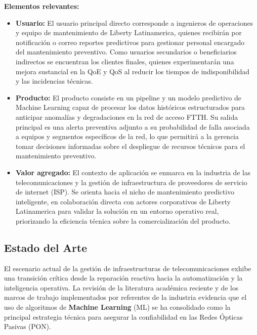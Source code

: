 \documentclass[12pt,a4paper]{article}
\begin{document}
    

    \noindent
    \textbf{Elementos relevantes:}
    \begin{itemize}
        \item \textbf{Usuario:} El usuario principal directo corresponde a ingenieros de operaciones y equipo de mantenimiento de Liberty Latinamerica, quienes recibirán por notificación o correo reportes
        predictivos para gestionar personal encargado del mantenimiento preventivo. Como usuarios secundarios o beneficiarios indirectos se encuentran los clientes finales, quienes experimentarán una mejora sustancial en la QoE
        y QoS al reducir los tiempos de indisponibilidad y las incidencias técnicas.
        \item \textbf{Producto:} El producto consiste en un pipeline y un modelo predictivo de Machine Learning capaz de procesar los datos históricos estructurados para anticipar anomalías y degradaciones en la red de acceso FTTH. Su salida
        principal es una alerta preventiva adjunto a su probabilidad de falla asociada a equipos y segmentos específicos de la red, lo que permitirá a la gerencia tomar decisiones informadas sobre el despliegue de recursos técnicos para el mantenimiento preventivo.
        \item \textbf{Valor agregado:} El contexto de aplicación se enmarca en la industria de las telecomunicaciones y la gestión de infraestructura de proveedores de servicio de internet (ISP). Se orienta hacia el nicho de mantenimiento predictivo
        inteligente, en colaboración directa con actores corporativos de Liberty Latinamerica para validar la solución en un entorno operativo real, priorizando la eficiencia técnica sobre la comercialización del producto. 
    \end{itemize}


    \newpage
\subsection{Estado del Arte}
\noindent
El escenario actual de la gestión de infraestructuras de telecomunicaciones exhibe una transición crítica desde la reparación reactiva hacia la automatización y la inteligencia operativa. La revisión de la literatura académica reciente y de los marcos de trabajo implementados por referentes de la industria evidencia que el uso de algoritmos 
de \textbf{Machine Learning} (ML) se ha consolidado como la principal estrategia técnica para asegurar la confiabilidad en las Redes Ópticas Pasivas (PON).
\end{document}
